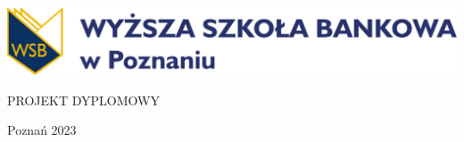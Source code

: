 \documentclass[12pt, oneside, a4paper]{book}
\begin{document}
\fancyhf{}
\renewcommand{\headrulewidth}{0pt}
\pagestyle{fancy}
\fancyfoot[C]{\thepage}
\begin{titlepage}
    \begin{center}

        \includegraphics[width=1\textwidth]{../wsb-logo.png}

        \MakeUppercase{\department}

        \vspace*{1cm}

        \textbf{\topic}

        PROJEKT DYPLOMOWY

        \vspace*{1.5cm}
        \textbf{\authors}

        \vfill
        Poznań 2023

    \end{center}
\end{titlepage}
\end{document}

